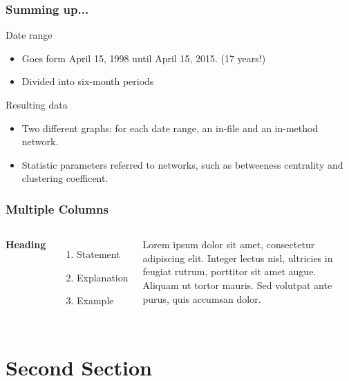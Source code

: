 \documentclass{beamer}
\begin{document}

\begin{frame}
\frametitle{Summing up...}
\begin{block}{Date range}
\begin{itemize}
\item Goes form April 15, 1998 until April 15, 2015. (17 years!)
\item Divided into six-month periods
\end{itemize}
\end{block}

\begin{block}{Resulting data}
\begin{itemize}
\item Two different graphs: for each date range, 
an in-file and an in-method network.
\item Statistic parameters referred to networks, such as betweeness centrality and clustering coefficent.
\end{itemize}
\end{block}

\end{frame}


\begin{frame}
\frametitle{Multiple Columns}
\begin{columns}[c] %

\textbf{Heading}
\begin{enumerate}
\item Statement
\item Explanation
\item Example
\end{enumerate}

Lorem ipsum dolor sit amet, consectetur adipiscing elit. Integer lectus nisl, ultricies in feugiat rutrum, porttitor sit amet augue. Aliquam ut tortor mauris. Sed volutpat ante purus, quis accumsan dolor.

\end{columns}
\end{frame}

\section{Second Section}
\end{document}

